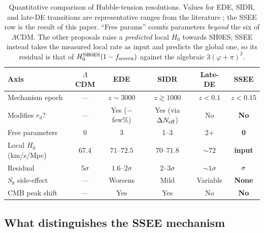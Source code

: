 \documentclass[12pt,a4paper]{article}
\newcommand{\phiG}{\varphi}
\newcommand{\fsc}{f_{\mathrm{screen}}}
\begin{document}
\begin{table}[ht]
\centering
\footnotesize
\caption{Quantitative comparison of Hubble-tension resolutions.  Values for
EDE, SIDR, and late-DE transitions are representative ranges from the
literature \citep{Poulin2019,Smith2020,Hill2020,Kreisch2020,Aloni2022,Schoneberg2022};
the SSEE row is the result of this paper.  ``Free params'' counts parameters
\emph{beyond} the six of $\Lambda$CDM.  The other proposals raise a
\emph{predicted} local $H_0$ towards SH0ES; SSEE instead takes the measured
local rate as input and predicts the global one, so its residual is that of
$H_0^{\rm SH0ES}(1-\fsc)$ against the algebraic $3(\phiG+\pi)^2$.}
\label{tab:comparison}
\begin{tabular}{lccccc}
\toprule
Axis & $\Lambda$CDM & EDE & SIDR & Late-DE & \textbf{SSEE} \\
\midrule
Mechanism epoch        & ---       & $z\sim 3000$ & $z\gtrsim 1000$ & $z<0.1$ & $z<0.15$ \\
Modifies $r_d$?        & ---       & Yes ($-$few\%) & Yes (via $\Delta N_{\rm eff}$) & No & \textbf{No} \\
Free parameters        & 0         & 3            & 1--3            & 2+      & \textbf{0} \\
Local $H_0$ (km/s/Mpc) & $67.4$    & $71$--$72.5$ & $70$--$71.8$    & $\sim 72$ & \textbf{input} \\
Residual                & $5\sigma$ & $1.6$--$2\sigma$ & $2$--$3\sigma$ & $\sim 1\sigma$ & $\mathbf{\val{p9_sh0es_sig_IR}\sigma}$ \\
$S_8$ side-effect      & ---       & Worsens      & Mild            & Variable & \textbf{None} \\
CMB peak shift         & ---       & Yes          & Yes             & No       & \textbf{No} \\
\bottomrule
\end{tabular}
\end{table}

\subsection{What distinguishes the SSEE mechanism}
\label{sec:distinctive}
\end{document}
